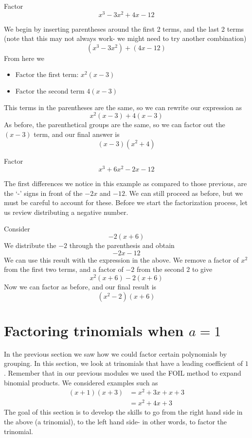 \begin{myexample}
Factor
\[
	x^3-3x^2+4x-12
\]
{}
\end{myexample}
\begin{myProof}
	We begin by inserting parentheses around the first 2 terms, and the last 2 terms (note that this may
	not always work- we might need to try another combination)
	\[
		(x^3-3x^2)+(4x-12)
	\]
	From here we
	\begin{itemize}
		\item Factor the first term: $x^2(x-3)$
		\item Factor the second term $4(x-3)$
	\end{itemize} 
	This terms in the parentheses are the same, so we can rewrite our expression as
	\[
		x^2(x-3)+4(x-3)
	\]
	As before, the parenthetical groups are the same, so we can factor out the $(x-3)$ term, 
	and our final answer is
	\[
		(x-3)(x^2+4)
	\]
\end{myProof} 

\begin{myexample}
Factor
\[
	x^3+6x^2-2x-12
\]
{}
\end{myexample}
\begin{myProof}
	The first differences we notice in this example as compared to those previous, are the
	`-' signs in front of the $-2x$ and $-12$. We can still proceed as before, but we must
	be careful to account for these. Before we start the factorization process, let us review 
	distributing a negative number.
			
	Consider
	\[
		-2(x+6)
	\]
	We distribute the $-2$ through the parenthesis and obtain
	\[
		-2x-12
	\]
	We can use this result with the expression in the above. We remove a factor of $x^2$ from the
	first two terms, and a factor of $-2$ from the second $2$ to give
	\[
		x^2(x+6)-2(x+6)
	\]
	Now we can factor as before, and our final result is
	\[
		(x^2-2)(x+6)
	\]
\end{myProof} 

\section{Factoring trinomials when $a=1$}
%
In the previous section we saw how we could factor certain polynomials by grouping. In this section, we look at
trinomials that have a leading \gls{coefficient} of $1$. Remember that in our previous modules we used the \gls{FOIL} method
to expand binomial products. We considered examples such as
\begin{align*}
	(x+1)(x+3) & =		x^2+3x+x+3 \\	
	           & =		x^2+4x+3   
\end{align*}
The goal of this section is to develop the skills to go from the right hand side in the above (a \gls{trinomial}), to the left hand side-
in other words, to factor the trinomial.

